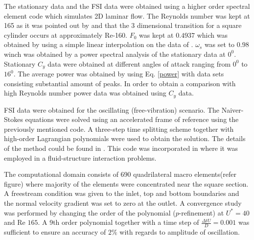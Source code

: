 The stationary data and the FSI data were obtained using a higher order spectral element code which simulates 2D laminar flow. The Reynolds number was kept at 165 as it was pointed out by \cite{Sheard2009} and \cite{Tong2008} that the 3 dimensional transition for a square cylinder occurs at approximately Re-160. $F_0$ was kept at $0.4937$ which was obtained by using a simple linear interpolation on the data of \cite{Joly2012}. $\omega_s$ was set to $0.98$ winch was obtained by a power spectral analysis of the stationary data at $0^0$. Stationary $C_y$ data were obtained at different angles of attack ranging from $0^0$ to $16^0$. The average power was obtained by using Eq. \eqref{power} with data sets consisting substantial amount of peaks. In order to obtain a comparison with high Reynolds number power data was obtained using \cite{Parkinson1964} $C_y$ data.


 FSI data were obtained for the oscillating (free-vibration) scenario. The Naiver-Stokes equations were solved using an accelerated frame of reference using the previously mentioned code. A three-step time splitting scheme together with high-order Lagrangian polynomials were used to obtain the solution. The details of the method could be found in \cite{Thompson2006,Thompson1996a}. This code was incorporated in \cite{Leontini2011,Leontini2007a}  where it was employed in a fluid-structure interaction problems. 
 
 The computational domain consists of 690 quadrilateral macro elements(refer figure) where majority of the elements were concentrated near the square section. A freestream condition was given to the inlet, top and bottom boundaries and the normal velocity gradient was set to zero at the outlet. A convergence study was performed by changing the order of the polynomial ($p$-refinement) at $U^*=40$ and Re $165$. A 9th order polynomial together with a time step of $\frac{\Delta tU}{D}=0.001$ was sufficient to ensure an accuracy of $2\%$ with regards to amplitude of oscillation.  
 

 
 
 

 
 
 
 









